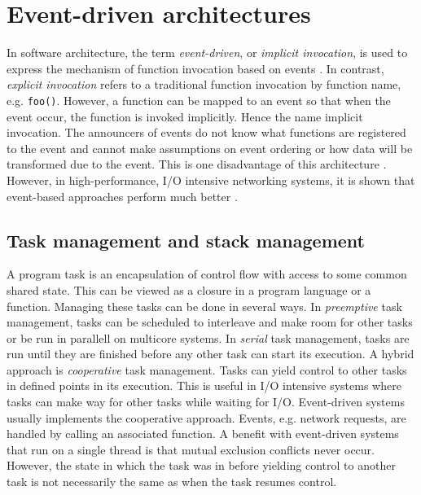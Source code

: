 \section{Event-driven architectures}

In software architecture, the term \textit{event-driven}, or \textit{implicit
invocation}, is used to express the mechanism of function invocation based on
events \cite{garlan1993introduction}. In contrast, \textit{explicit invocation}
refers to a traditional function invocation by function name, e.g.
\lstinline{foo()}. However, a function can be mapped to an event
so that when the event occur, the function is invoked implicitly. Hence the
name implicit invocation. The announcers of events do not know what functions
are registered to the event and cannot make assumptions on event ordering or
how data will be transformed due to the event. This is one disadvantage of this
architecture \cite{garlan1993introduction}. However, in high-performance, I/O
intensive networking systems, it is shown that event-based approaches perform
much better \cite{hu1997measuring}.


\subsection{Task management and stack management}

A program task is an encapsulation of control flow with access to some common
shared state. This can be viewed as a closure in a program language or a
function. Managing these tasks can be done in several ways. In
\textit{preemptive} task management, tasks can be scheduled to interleave and
make room for other tasks or be run in parallell on multicore systems. In
\textit{serial} task management, tasks are run until they are finished before
any other task can start its execution. A hybrid approach is
\textit{cooperative} task management. Tasks can yield control to other tasks in
defined points in its execution. This is useful in I/O intensive systems where
tasks can make way for other tasks while waiting for I/O. Event-driven systems
usually implements the cooperative approach. Events, e.g.  network requests,
are handled by calling an associated function. A benefit with event-driven
systems that run on a single thread is that mutual exclusion conflicts never
occur. However, the state in which the task was in before yielding control to
another task is not necessarily the same as when the task resumes control.
\cite{adya2002cooperative}

